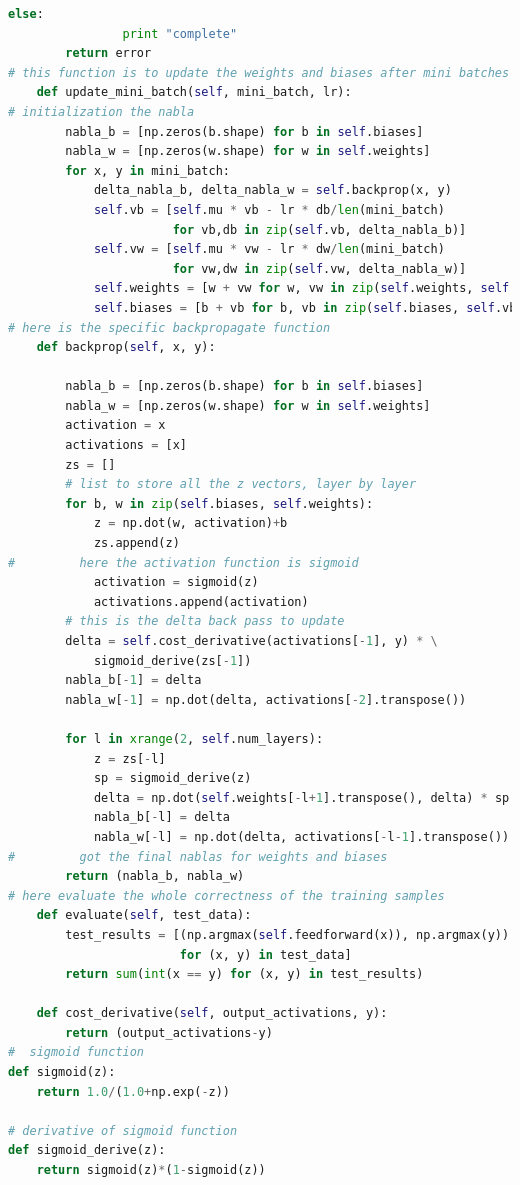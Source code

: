 \documentclass[12pt,a4paper]{article}
\begin{document}
\begin{lstlisting}[language=Python]
            else:
                print "complete"
        return error
# this function is to update the weights and biases after mini batches
    def update_mini_batch(self, mini_batch, lr):
# initialization the nabla
        nabla_b = [np.zeros(b.shape) for b in self.biases]
        nabla_w = [np.zeros(w.shape) for w in self.weights]
        for x, y in mini_batch:
            delta_nabla_b, delta_nabla_w = self.backprop(x, y)
            self.vb = [self.mu * vb - lr * db/len(mini_batch) 
                       for vb,db in zip(self.vb, delta_nabla_b)]
            self.vw = [self.mu * vw - lr * dw/len(mini_batch) 
                       for vw,dw in zip(self.vw, delta_nabla_w)]
            self.weights = [w + vw for w, vw in zip(self.weights, self.vw)]
            self.biases = [b + vb for b, vb in zip(self.biases, self.vb)]
# here is the specific backpropagate function
    def backprop(self, x, y):

        nabla_b = [np.zeros(b.shape) for b in self.biases]
        nabla_w = [np.zeros(w.shape) for w in self.weights]
        activation = x
        activations = [x] 
        zs = [] 
        # list to store all the z vectors, layer by layer
        for b, w in zip(self.biases, self.weights):
            z = np.dot(w, activation)+b
            zs.append(z)
#         here the activation function is sigmoid
            activation = sigmoid(z)
            activations.append(activation)
        # this is the delta back pass to update
        delta = self.cost_derivative(activations[-1], y) * \
            sigmoid_derive(zs[-1])
        nabla_b[-1] = delta
        nabla_w[-1] = np.dot(delta, activations[-2].transpose())
        
        for l in xrange(2, self.num_layers):
            z = zs[-l]
            sp = sigmoid_derive(z)
            delta = np.dot(self.weights[-l+1].transpose(), delta) * sp
            nabla_b[-l] = delta
            nabla_w[-l] = np.dot(delta, activations[-l-1].transpose())
#         got the final nablas for weights and biases
        return (nabla_b, nabla_w)
# here evaluate the whole correctness of the training samples
    def evaluate(self, test_data):
        test_results = [(np.argmax(self.feedforward(x)), np.argmax(y))
                        for (x, y) in test_data]
        return sum(int(x == y) for (x, y) in test_results)

    def cost_derivative(self, output_activations, y):
        return (output_activations-y)
#  sigmoid function
def sigmoid(z):
    return 1.0/(1.0+np.exp(-z))

# derivative of sigmoid function
def sigmoid_derive(z):
    return sigmoid(z)*(1-sigmoid(z))
\end{lstlisting}
\end{document}
